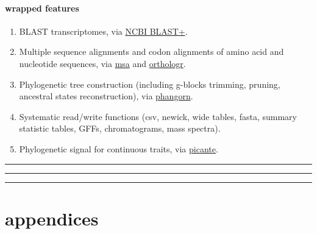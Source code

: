\documentclass[
]{krantz}
\providecommand{\tightlist}{%
  \setlength{\itemsep}{0pt}\setlength{\parskip}{0pt}}
\begin{document}
\hypertarget{wrapped-features}{%
\subsection{wrapped features}\label{wrapped-features}}

\begin{enumerate}
\def\labelenumi{\arabic{enumi}.}
\tightlist
\item
  BLAST transcriptomes, via \href{https://blast.ncbi.nlm.nih.gov/Blast.cgi?PAGE_TYPE=BlastDocs\&DOC_TYPE=Download}{NCBI BLAST+}.
\item
  Multiple sequence alignments and codon alignments of amino acid and nucleotide sequences, via \href{https://bioconductor.org/packages/release/bioc/html/msa.html}{msa} and \href{https://github.com/HajkD/orthologr}{orthologr}.
\item
  Phylogenetic tree construction (including g-blocks trimming, pruning, ancestral states reconstruction), via \href{https://cran.r-project.org/web/packages/phangorn/index.html}{phangorn}.
\item
  Systematic read/write functions (csv, newick, wide tables, fasta, summary statistic tables, GFFs, chromatograms, mass spectra).
\item
  Phylogenetic signal for continuous traits, via \href{https://cran.r-project.org/web/packages/picante/index.html}{picante}.
\end{enumerate}

\begin{center}\rule{0.5\linewidth}{0.5pt}\end{center}

\begin{center}\rule{0.5\linewidth}{0.5pt}\end{center}

\begin{center}\rule{0.5\linewidth}{0.5pt}\end{center}

\hypertarget{part-appendices}{%
\part{appendices}\label{part-appendices}}

\hypertarget{section-1}{%
\section*{}\label{section-1}}
\end{document}
